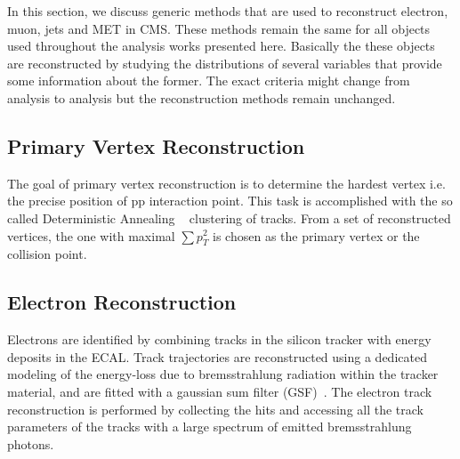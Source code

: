 In this section, we discuss generic methods that are used to reconstruct electron, muon, jets and MET in CMS. These methods remain the same for all  objects used throughout the analysis works presented here. Basically the these objects are reconstructed by studying the distributions of several variables that provide some information about the former. The exact criteria might change from analysis to analysis but the reconstruction methods remain unchanged.

\subsection{ Primary Vertex Reconstruction}

The goal of primary vertex reconstruction is to determine the hardest vertex i.e. the precise position of pp interaction point. This task is accomplished with the so called Deterministic Annealing ~\cite{PValgo} clustering of tracks. From a set of reconstructed vertices, the one with maximal $\sum p_{T}^{2}$ is chosen as the primary vertex or the collision point.




\subsection{Electron Reconstruction}

Electrons are identified by combining tracks in the silicon tracker with energy deposits in the ECAL. Track trajectories are reconstructed using a dedicated modeling of the energy-loss due to bremsstrahlung radiation within the tracker material, and are fitted with a gaussian sum filter (GSF)~\cite{GSF}. The electron track reconstruction is performed by collecting the hits and accessing all the track parameters of the tracks with a large spectrum of emitted bremsstrahlung photons. 

